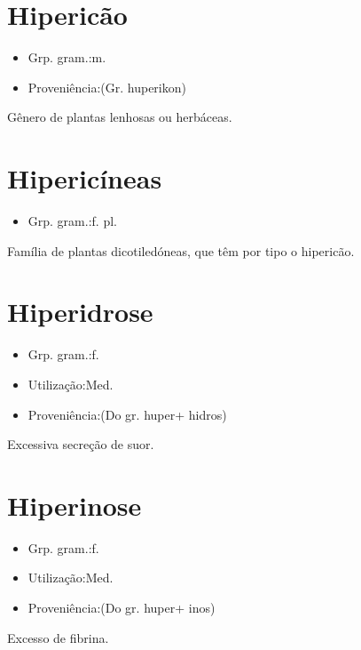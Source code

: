 \documentclass{article}
\begin{document}
\section{Hipericão}
\begin{itemize}
\item {Grp. gram.:m.}
\end{itemize}
\begin{itemize}
\item {Proveniência:(Gr. \textunderscore huperikon\textunderscore )}
\end{itemize}
Gênero de plantas lenhosas ou herbáceas.
\section{Hipericíneas}
\begin{itemize}
\item {Grp. gram.:f. pl.}
\end{itemize}
Família de plantas dicotiledóneas, que têm por tipo o hipericão.
\section{Hiperidrose}
\begin{itemize}
\item {Grp. gram.:f.}
\end{itemize}
\begin{itemize}
\item {Utilização:Med.}
\end{itemize}
\begin{itemize}
\item {Proveniência:(Do gr. \textunderscore huper\textunderscore  + \textunderscore hidros\textunderscore )}
\end{itemize}
Excessiva secreção de suor.
\section{Hiperinose}
\begin{itemize}
\item {Grp. gram.:f.}
\end{itemize}
\begin{itemize}
\item {Utilização:Med.}
\end{itemize}
\begin{itemize}
\item {Proveniência:(Do gr. \textunderscore huper\textunderscore  + \textunderscore inos\textunderscore )}
\end{itemize}
Excesso de fibrina.
\end{document}
